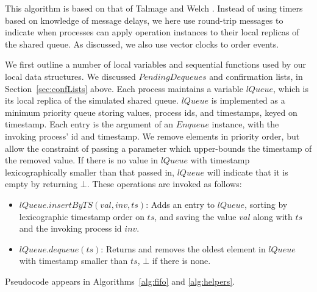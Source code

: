 \documentclass[a4paper,anonymous,USenglish]{lipics-v2021} %
\theoremstyle{definition}
\begin{document}
This algorithm is based on that of Talmage and Welch \cite{TalmageWelch14}.  Instead of using timers based on knowledge of message delays, we here use round-trip messages to indicate when processes can apply operation instances to their local replicas of the shared queue.  As discussed, we also use vector clocks to order events.

We first outline a number of local variables and sequential functions used by our local data structures.  We discussed $PendingDequeues$ and confirmation lists, in Section~\ref{sec:confLists} above.  Each process maintains a variable $lQueue$, which is its local replica of the simulated shared queue.  $lQueue$ is implemented as a minimum priority queue storing values, process ids, and timestamps, keyed on timestamp.  Each entry is the argument of an $Enqueue$ instance, with the invoking process' id and timestamp.  We remove elements in priority order, but allow the constraint of passing a parameter which upper-bounds the timestamp of the removed value.  If there is no value in $lQueue$ with timestamp lexicographically smaller than that passed in, $lQueue$ will indicate that it is empty by returning $\bot$.  These operations are invoked as follows:
\begin{itemize}
\item $lQueue.insertByTS(val, inv, ts)$: Adds an entry to $lQueue$, sorting by lexicographic timestamp order on $ts$, and saving the value $val$ along with $ts$ and the invoking process id $inv$.
\item $lQueue.dequeue(ts)$: Returns and removes the oldest element in $lQueue$ with timestamp smaller than $ts$, $\bot$ if there is none.
\end{itemize}
Pseudocode appears in Algorithms~\ref{alg:fifo} and \ref{alg:helpers}.
\end{document}
